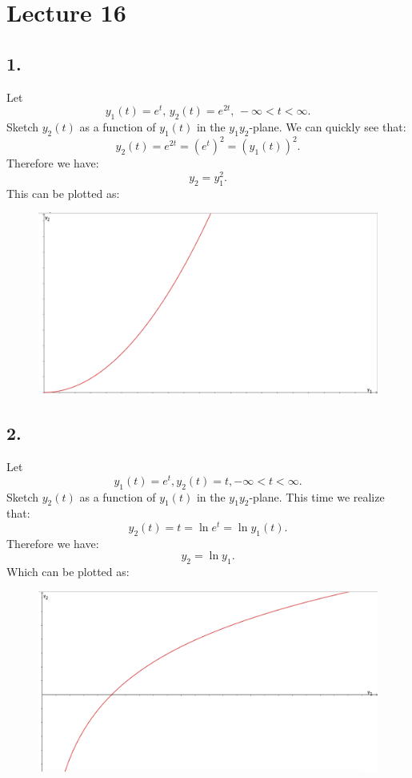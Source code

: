 \section*{Lecture 16}

\subsection*{1.} Let
\[ 
y_1(t) = e^{t}, \,  y_2(t) = e^{2t}, \, -\infty < t < \infty
.\]
Sketch $y_2(t)$ as a function of $y_1(t)$ in the $y_1y_2$-plane.
\bigbreak
We can quickly see that:
\[ 
y_2(t) = e^{2t} = \left( e^{t} \right)^2 = \left( y_1(t) \right)^2
.\]
Therefore we have:
\[ 
y_2 = y_1^2
.\]
This can be plotted as:
\begin{figure} [ht]
  \centering
  \includegraphics[width=0.5\linewidth]{./figures/e16_1.png}
  \caption{}
  \label{fig:e16_1}
\end{figure}


\subsection*{2.} Let
\[ 
y_1(t) = e^{t}, y_2(t) = t, -\infty < t < \infty
.\]
Sketch $y_2(t)$ as a function of $y_1(t)$ in the $y_1y_2$-plane.
\bigbreak
This time we realize that:
\[ 
y_2(t) = t = \ln e^{t} = \ln y_1(t)
.\]
Therefore we have:
\[ 
y_2 = \ln y_1
.\]
Which can be plotted as:
\begin{figure} [ht]
  \centering
  \includegraphics[width=0.5\linewidth]{./figures/e16_2.png}
  \caption{}
  \label{fig:e16_2}
\end{figure}


